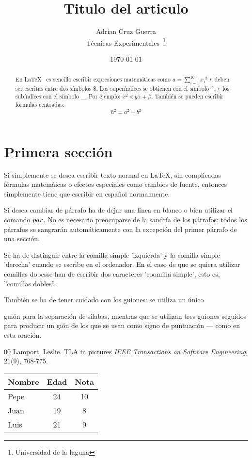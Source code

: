 \documentclass[a4paper, 12pt]{article}
\begin{document}
\title {Titulo del articulo}
\author {Adrian Cruz Guerra\\
	    Técnicas Experimentales~\footnote{Universidad de la laguna}
	    }
\date {\today}
\maketitle
\begin{abstract}
  En \LaTeX {}~\cite{Lam:86} es sencillo escribir expresiones 
  matemáticas como $a=\sum_{i=1}^{10} {x_i}^{3}$
  y deben ser escritas entre dos símbolos \$.
  Los superíndices se obtienen con el símbolo \^{}, y
  los subíndices con el símbolo \_.
  Por ejemplo: $x^2 \times y {\alpha + \beta}$.
  También se pueden escribir fórmulas centradas:
  \[h^2=a^2 + b^2\]
\end {abstract}

\section {Primera sección}
Si simplemente se desea escribir texto normal en LaTeX,
sin complicadas f\'ormulas matem\'aicas o efectos especiales
como cambios de fuente, entonces simplemente tiene que escribir
en espa\~nol normalmente. \par
Si desea cambiar de párrafo ha de dejar una linea en blanco o bien
utilizar el comando $\\par$.
No es necesario preocuparse de la sandría de los párrafos:
todos los párrafos se sangrarán automáticamente con la excepción
del primer párrafo de una sección.


Se ha de distinguir entre la comilla simple 'izquierda'
y la comilla simple 'derecha' cuando se escribe en el ordenador.
En el caso de que se quiera utilizar comillas dobesse han de escribir
dos caracteres 'coomilla simple', esto es, 
''comillas dobles''.


También se ha de tener cuidado con los guiones: se utiliza un único

guión para la separación de sílabas, mientras que se utilizan 
tres guiones seguidos para producir un gión de los que se usan
como signo de puntuación --- como en esta oración.
\begin {thebibliography}{00}
    Lamport, Leslie.
    TLA in pictures
    \emph {IEEE Transactions on Software Engineering},
    21(9), 768-775.
\end {thebibliography}
\bigskip
\begin {tabular} {|l|c|c|}
\hline
  Nombre & Edad & Nota \\ \hline
  Pepe   &   24 &   10 \\ \hline
  Juan   &   19 &    8 \\ \hline
  Luis   &   21 &    9 \\ \hline
\end {tabular}
\end{document}
